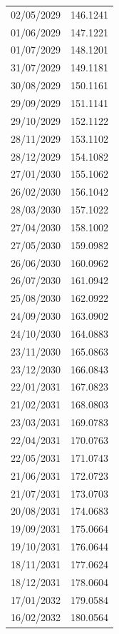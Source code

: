 \documentclass{apmcmthesis}
\begin{document}
\begin{longtable}{c c}
        02/05/2029 & 146.1241   \\
        01/06/2029 & 147.1221   \\
        01/07/2029 & 148.1201   \\
        31/07/2029 & 149.1181   \\
        30/08/2029 & 150.1161   \\
        29/09/2029 & 151.1141   \\
        29/10/2029 & 152.1122   \\
        28/11/2029 & 153.1102   \\
        28/12/2029 & 154.1082   \\
        27/01/2030 & 155.1062   \\
        26/02/2030 & 156.1042   \\
        28/03/2030 & 157.1022   \\
        27/04/2030 & 158.1002   \\
        27/05/2030 & 159.0982   \\
        26/06/2030 & 160.0962   \\
        26/07/2030 & 161.0942   \\
        25/08/2030 & 162.0922   \\
        24/09/2030 & 163.0902   \\
        24/10/2030 & 164.0883   \\
        23/11/2030 & 165.0863   \\
        23/12/2030 & 166.0843   \\
        22/01/2031 & 167.0823   \\
        21/02/2031 & 168.0803   \\
        23/03/2031 & 169.0783   \\
        22/04/2031 & 170.0763   \\
        22/05/2031 & 171.0743   \\
        21/06/2031 & 172.0723   \\
        21/07/2031 & 173.0703   \\
        20/08/2031 & 174.0683   \\
        19/09/2031 & 175.0664   \\
        19/10/2031 & 176.0644   \\
        18/11/2031 & 177.0624   \\
        18/12/2031 & 178.0604   \\
        17/01/2032 & 179.0584   \\
        16/02/2032 & 180.0564   \\

\end{longtable}
\end{document}
